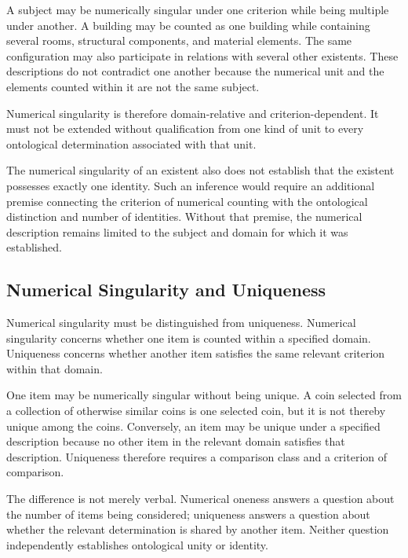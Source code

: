 A subject may be numerically singular under one
criterion while being multiple under another.
A building may be counted as one building while
containing several rooms, structural components,
and material elements. The same configuration
may also participate in relations with several
other existents. These descriptions do not
contradict one another because the numerical
unit and the elements counted within it are
not the same subject.

Numerical singularity is therefore domain-relative
and criterion-dependent. It must not be extended
without qualification from one kind of unit
to every ontological determination associated
with that unit.

The numerical singularity of an existent also
does not establish that the existent possesses
exactly one identity. Such an inference would
require an additional premise connecting the
criterion of numerical counting with the
ontological distinction and number of identities.
Without that premise, the numerical description
remains limited to the subject and domain
for which it was established.

\subsection{Numerical Singularity and Uniqueness}

Numerical singularity must be distinguished
from uniqueness. Numerical singularity concerns
whether one item is counted within a specified
domain. Uniqueness concerns whether another
item satisfies the same relevant criterion
within that domain.

One item may be numerically singular without
being unique. A coin selected from a collection
of otherwise similar coins is one selected coin,
but it is not thereby unique among the coins.
Conversely, an item may be unique under a
specified description because no other item
in the relevant domain satisfies that description.
Uniqueness therefore requires a comparison
class and a criterion of comparison.

The difference is not merely verbal. Numerical
oneness answers a question about the number
of items being considered; uniqueness answers
a question about whether the relevant
determination is shared by another item.
Neither question independently establishes
ontological unity or identity.



